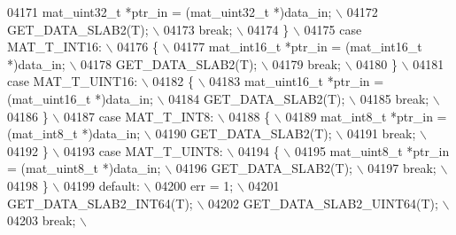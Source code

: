 \begin{DoxyCode}
{{{{{{{{{{{{{{{{{{{{{{{{{04171 \textcolor{preprocessor}{                mat\_uint32\_t *ptr\_in = (mat\_uint32\_t *)data\_in; \(\backslash\)}
04172 \textcolor{preprocessor}{                GET\_DATA\_SLAB2(T); \(\backslash\)}
04173 \textcolor{preprocessor}{                break; \(\backslash\)}
04174 \textcolor{preprocessor}{            \} \(\backslash\)}
04175 \textcolor{preprocessor}{            case MAT\_T\_INT16: \(\backslash\)}
04176 \textcolor{preprocessor}{            \{ \(\backslash\)}
04177 \textcolor{preprocessor}{                mat\_int16\_t *ptr\_in = (mat\_int16\_t *)data\_in; \(\backslash\)}
04178 \textcolor{preprocessor}{                GET\_DATA\_SLAB2(T); \(\backslash\)}
04179 \textcolor{preprocessor}{                break; \(\backslash\)}
04180 \textcolor{preprocessor}{            \} \(\backslash\)}
04181 \textcolor{preprocessor}{            case MAT\_T\_UINT16: \(\backslash\)}
04182 \textcolor{preprocessor}{            \{ \(\backslash\)}
04183 \textcolor{preprocessor}{                mat\_uint16\_t *ptr\_in = (mat\_uint16\_t *)data\_in; \(\backslash\)}
04184 \textcolor{preprocessor}{                GET\_DATA\_SLAB2(T); \(\backslash\)}
04185 \textcolor{preprocessor}{                break; \(\backslash\)}
04186 \textcolor{preprocessor}{            \} \(\backslash\)}
04187 \textcolor{preprocessor}{            case MAT\_T\_INT8: \(\backslash\)}
04188 \textcolor{preprocessor}{            \{ \(\backslash\)}
04189 \textcolor{preprocessor}{                mat\_int8\_t *ptr\_in = (mat\_int8\_t *)data\_in; \(\backslash\)}
04190 \textcolor{preprocessor}{                GET\_DATA\_SLAB2(T); \(\backslash\)}
04191 \textcolor{preprocessor}{                break; \(\backslash\)}
04192 \textcolor{preprocessor}{            \} \(\backslash\)}
04193 \textcolor{preprocessor}{            case MAT\_T\_UINT8: \(\backslash\)}
04194 \textcolor{preprocessor}{            \{ \(\backslash\)}
04195 \textcolor{preprocessor}{                mat\_uint8\_t *ptr\_in = (mat\_uint8\_t *)data\_in; \(\backslash\)}
04196 \textcolor{preprocessor}{                GET\_DATA\_SLAB2(T); \(\backslash\)}
04197 \textcolor{preprocessor}{                break; \(\backslash\)}
04198 \textcolor{preprocessor}{            \} \(\backslash\)}
04199 \textcolor{preprocessor}{            default: \(\backslash\)}
04200 \textcolor{preprocessor}{                err = 1; \(\backslash\)}
04201 \textcolor{preprocessor}{                GET\_DATA\_SLAB2\_INT64(T); \(\backslash\)}
04202 \textcolor{preprocessor}{                GET\_DATA\_SLAB2\_UINT64(T); \(\backslash\)}
04203 \textcolor{preprocessor}{                break; \(\backslash\)}
}}}}}}}}}}}}}}}}}}}}}}}}}
\end{DoxyCode}
